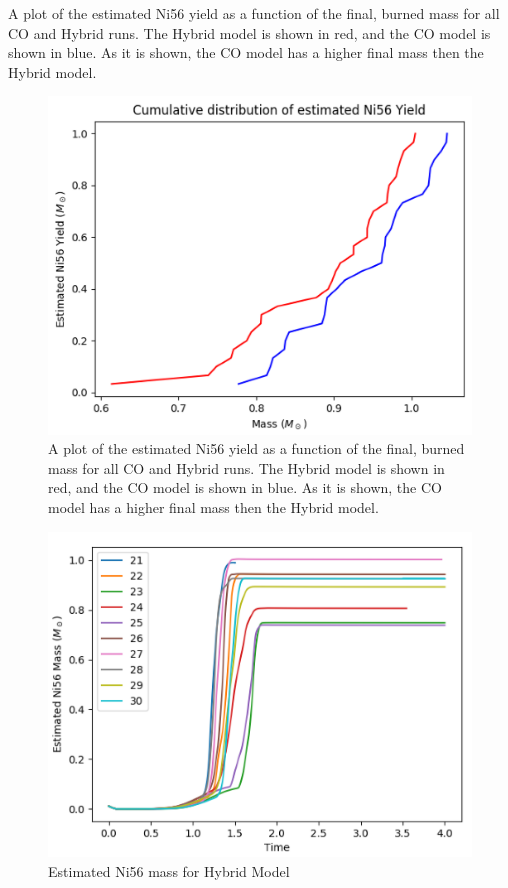 \documentclass[iop,apj]{emulateapj}
\begin{document}
A plot of the estimated Ni56 yield as a function of the final, burned mass
for all CO and Hybrid runs. The Hybrid model is shown in red, and the CO
model is shown in blue. As it is shown, the CO model has a higher final mass
then the Hybrid model. 

\begin{figure}
\includegraphics[width=\columnwidth]{figures/ni56_yield_cum_dist.png}
\caption{\label{fig:cumdist}
A plot of the estimated Ni56 yield as a function of the final, burned mass
for all CO and Hybrid runs. The Hybrid model is shown in red, and the CO
model is shown in blue. As it is shown, the CO model has a higher final mass
then the Hybrid model. 
}
\end{figure}

\begin{figure}
\includegraphics[width=\columnwidth]{figures/ni56_vs_time_hybrid.png}
\caption{\label{fig:nithybrid}
Estimated Ni56 mass for Hybrid Model
}
\end{figure}
\end{document}
